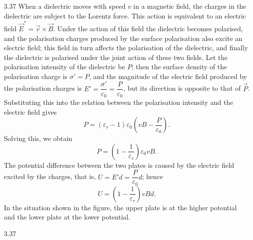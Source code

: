 \begin{solution}{3.37}
When a dielectric moves with speed $v$ in a magnetic field, the charges in the dielectric are subject to the Lorentz force. This action is equivalent to an electric field $\vec{E}^{*}=\vec{v}\times\vec{B}$. Under the action of this field the dielectric becomes polarised, and the polarisation charges produced by the surface polarisation also excite an electric field; this field in turn affects the polarisation of the dielectric, and finally the dielectric is polarised under the joint action of these two fields. Let the polarisation intensity of the dielectric be $P$; then the surface density of the polarisation charge is $\sigma'=P$, and the magnitude of the electric field produced by the polarisation charges is $E'=\dfrac{\sigma'}{\varepsilon_0}=\dfrac{P}{\varepsilon_0}$, but its direction is opposite to that of $\vec{P}$. Substituting this into the relation between the polarisation intensity and the electric field gives
\[
P=(\varepsilon_r-1)\varepsilon_0\left(vB-\frac{P}{\varepsilon_0}\right).
\]
Solving this, we obtain
\begin{equation}
P=\left(1-\frac{1}{\varepsilon_r}\right)\varepsilon_0vB. \tag{1}
\end{equation}
The potential difference between the two plates is caused by the electric field excited by the charges, that is, $U=E'd=\dfrac{P}{\varepsilon_0}d$; hence
\begin{equation}
U=\left(1-\frac{1}{\varepsilon_r}\right)vBd. \tag{2}
\end{equation}
In the situation shown in the figure, the upper plate is at the higher potential and the lower plate at the lower potential.

\begin{figbox}{3.37}
\end{figbox}
\end{solution}

